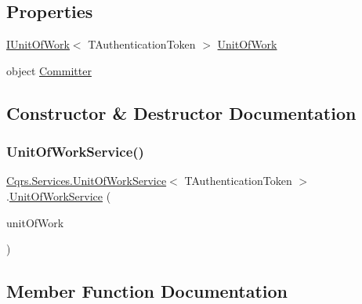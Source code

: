 \subsection*{Properties}
\begin{DoxyCompactItemize}
\item 
\hyperlink{interfaceCqrs_1_1Domain_1_1IUnitOfWork}{I\+Unit\+Of\+Work}$<$ T\+Authentication\+Token $>$ \hyperlink{classCqrs_1_1Services_1_1UnitOfWorkService_a1ba76512e37e5006c2b65d071803e99f}{Unit\+Of\+Work}
\item 
object \hyperlink{classCqrs_1_1Services_1_1UnitOfWorkService_aabeccb6ba949fe02b8676b324f85950b}{Committer}
\end{DoxyCompactItemize}


\subsection{Constructor \& Destructor Documentation}
\mbox{\label{classCqrs_1_1Services_1_1UnitOfWorkService_a187b3f612490a8316770bb7c6a9aa25f}} 
\subsubsection{\texorpdfstring{Unit\+Of\+Work\+Service()}{UnitOfWorkService()}}
{\footnotesize\ttfamily \hyperlink{classCqrs_1_1Services_1_1UnitOfWorkService}{Cqrs.\+Services.\+Unit\+Of\+Work\+Service}$<$ T\+Authentication\+Token $>$.\hyperlink{classCqrs_1_1Services_1_1UnitOfWorkService}{Unit\+Of\+Work\+Service} (\begin{DoxyParamCaption}\item[{\hyperlink{interfaceCqrs_1_1Domain_1_1IUnitOfWork}{I\+Unit\+Of\+Work}$<$ T\+Authentication\+Token $>$}]{unit\+Of\+Work }\end{DoxyParamCaption})}



\subsection{Member Function Documentation}
\mbox{\label{classCqrs_1_1Services_1_1UnitOfWorkService_a3291740821150ecea174820ed27ee56c}} 
